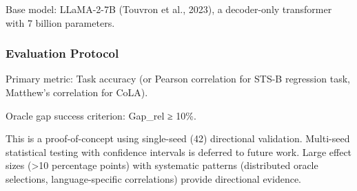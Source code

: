 Base model: LLaMA-2-7B (Touvron et al., 2023), a decoder-only transformer with 7 billion parameters.

\subsubsection{Evaluation Protocol}

Primary metric: Task accuracy (or Pearson correlation for STS-B regression task, Matthew's correlation for CoLA).

Oracle gap success criterion: Gap_rel ≥ 10\%.

This is a proof-of-concept using single-seed (42) directional validation. Multi-seed statistical testing with confidence intervals is deferred to future work. Large effect sizes (>10 percentage points) with systematic patterns (distributed oracle selections, language-specific correlations) provide directional evidence.
